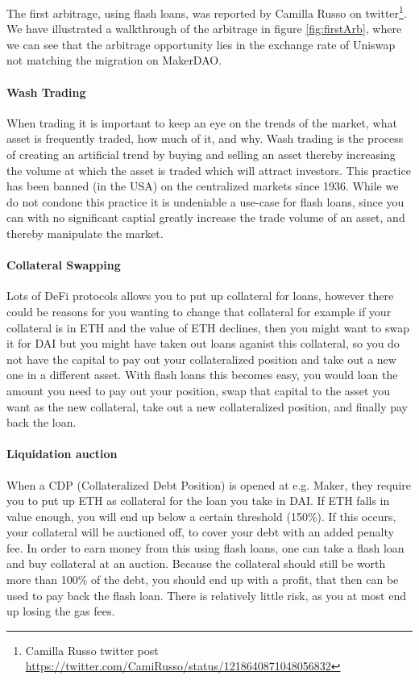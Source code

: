 The first arbitrage, using flash loans, was reported by Camilla Russo
on twitter\footnote{Camilla Russo twitter post
  \url{https://twitter.com/CamiRusso/status/1218640871048056832}}. We
have illustrated a walkthrough of the arbitrage in figure
\ref{fig:firstArb}, where we can see that the arbitrage opportunity
lies in the exchange rate of Uniswap not matching the migration on
MakerDAO.

\paragraph{Wash Trading} When trading it is important to keep an eye
on the trends of the market, what asset is frequently traded, how much
of it, and why. Wash trading is the process of creating an artificial
trend by buying and selling an asset thereby increasing the volume at
which the asset is traded which will attract investors. This practice
has been banned (in the USA) on the centralized markets since
1936. While we do not condone this practice it is undeniable a
use-case for flash loans, since you can with no significant captial greatly
increase the trade volume of an asset, and thereby manipulate the
market.

\paragraph{Collateral Swapping} Lots of DeFi protocols allows you to
put up collateral for loans, however there could be reasons for you
wanting to change that collateral for example if your collateral is in
ETH and the value of ETH declines, then you might want to swap it for
DAI but you might have taken out loans aganist this collateral, so you
do not have the capital to pay out your collateralized position and
take out a new one in a different asset. With flash loans this becomes
easy, you would loan the amount you need to pay out your position, swap
that capital to the asset you want as the new collateral, take out a
new collateralized position, and finally pay back the loan.

\paragraph{Liquidation auction} When a CDP (Collateralized Debt Position) is
opened at e.g. Maker, they require you to put up ETH as collateral for the loan
you take in DAI. If ETH falls in value enough, you will end up below a certain
threshold (150\%). If this occurs, your collateral will be auctioned off, to
cover your debt with an added penalty fee. In order to earn money from this
using flash loans, one can take a flash loan and buy collateral at an auction.
Because the collateral should still be worth more than 100\% of the debt, you
should end up with a profit, that then can be used to pay back the flash loan.
There is relatively little risk, as you at most end up losing the gas fees.

